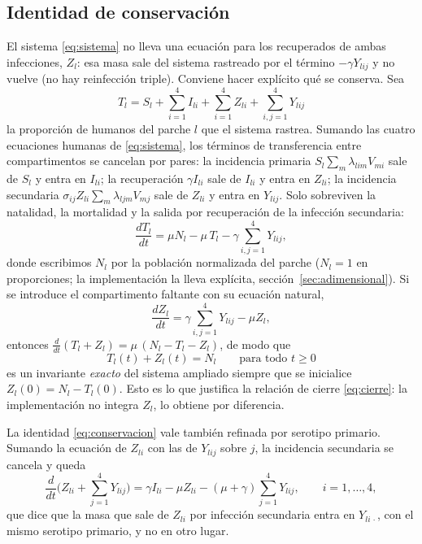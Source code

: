 \documentclass{article}
\numberwithin{equation}{section}
\begin{document}
\subsection{Identidad de conservación}\label{sec:conservacion}

El sistema \eqref{eq:sistema} no lleva una ecuación para los recuperados de ambas infecciones, $Z_l$: esa masa sale del sistema rastreado por el término $-\gamma Y_{lij}$ y no vuelve (no hay reinfección triple). Conviene hacer explícito qué se conserva. Sea
\begin{equation}\label{eq:T}
T_l = S_l+\sum_{i=1}^4 I_{li}+\sum_{i=1}^4 Z_{li}+\sum_{i,j=1}^4 Y_{lij}
\end{equation}
la proporción de humanos del parche $l$ que el sistema rastrea. Sumando las cuatro ecuaciones humanas de \eqref{eq:sistema}, los términos de transferencia entre compartimentos se cancelan por pares: la incidencia primaria $S_l\sum_m\lambda_{lim}V_{mi}$ sale de $S_l$ y entra en $I_{li}$; la recuperación $\gamma I_{li}$ sale de $I_{li}$ y entra en $Z_{li}$; la incidencia secundaria $\sigma_{ij}Z_{li}\sum_m\lambda_{ljm}V_{mj}$ sale de $Z_{li}$ y entra en $Y_{lij}$. Solo sobreviven la natalidad, la mortalidad y la salida por recuperación de la infección secundaria:
\begin{equation}\label{eq:conservacion}
\frac{d T_l}{dt}=\mu N_l-\mu\,T_l-\gamma\sum_{i,j=1}^4 Y_{lij},
\end{equation}
donde escribimos $N_l$ por la población normalizada del parche ($N_l=1$ en proporciones; la implementación la lleva explícita, sección~\ref{sec:adimensional}). Si se introduce el compartimento faltante con su ecuación natural,
\begin{equation}\label{eq:Zl}
\frac{dZ_l}{dt}=\gamma\sum_{i,j=1}^4 Y_{lij}-\mu Z_l,
\end{equation}
entonces $\frac{d}{dt}(T_l+Z_l)=\mu\,(N_l-T_l-Z_l)$, de modo que
\begin{equation}\label{eq:invariante}
T_l(t)+Z_l(t)=N_l\qquad\text{para todo }t\ge 0
\end{equation}
es un invariante \emph{exacto} del sistema ampliado siempre que se inicialice $Z_l(0)=N_l-T_l(0)$. Esto es lo que justifica la relación de cierre \eqref{eq:cierre}: la implementación no integra $Z_l$, lo obtiene por diferencia.

La identidad \eqref{eq:conservacion} vale también refinada por serotipo primario. Sumando la ecuación de $Z_{li}$ con las de $Y_{lij}$ sobre $j$, la incidencia secundaria se cancela y queda
\begin{equation}\label{eq:conservacion-cepa}
\frac{d}{dt}\Big(Z_{li}+\sum_{j=1}^4 Y_{lij}\Big)=\gamma I_{li}-\mu Z_{li}-(\mu+\gamma)\sum_{j=1}^4 Y_{lij},\qquad i=1,\dots,4,
\end{equation}
que dice que la masa que sale de $Z_{li}$ por infección secundaria entra en $Y_{li\,\cdot}$, con el mismo serotipo primario, y no en otro lugar.
\end{document}
